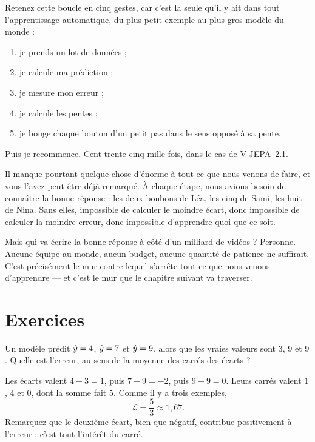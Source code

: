 \begin{aretenir}
Retenez cette boucle en cinq gestes, car c'est la seule qu'il y ait dans
tout l'apprentissage automatique, du plus petit exemple au plus gros modèle
du monde :

\begin{enumerate}
  \item je prends un lot de données ;
  \item je calcule ma prédiction ;
  \item je mesure mon erreur ;
  \item je calcule les pentes ;
  \item je bouge chaque bouton d'un petit pas dans le sens opposé à sa pente.
\end{enumerate}

Puis je recommence. Cent trente-cinq mille fois, dans le cas de V-JEPA~2.1.
\end{aretenir}

Il manque pourtant quelque chose d'énorme à tout ce que nous venons de
faire, et vous l'avez peut-être déjà remarqué. À chaque étape, nous avions
besoin de connaître la bonne réponse : les deux bonbons de Léa, les cinq de
Sami, les huit de Nina. Sans elles, impossible de calculer le moindre écart,
donc impossible de calculer la moindre erreur, donc impossible d'apprendre
quoi que ce soit.

Mais qui va écrire la bonne réponse à côté d'un milliard de vidéos ?
Personne. Aucune équipe au monde, aucun budget, aucune quantité de patience
ne suffirait. C'est précisément le mur contre lequel s'arrête tout ce que
nous venons d'apprendre — et c'est le mur que le chapitre suivant va
traverser.

\section*{Exercices}

\begin{exercice}
Un modèle prédit $\hat{y} = 4$, $\hat{y} = 7$ et $\hat{y} = 9$, alors que
les vraies valeurs sont $3$, $9$ et $9$. Quelle est l'erreur, au sens de la
moyenne des carrés des écarts ?
\end{exercice}

\begin{solution}
Les écarts valent $4 - 3 = 1$, puis $7 - 9 = -2$, puis $9 - 9 = 0$. Leurs
carrés valent $1$, $4$ et $0$, dont la somme fait $5$. Comme il y a trois
exemples,
\[
  \mathcal{L} = \frac{5}{3} \approx 1{,}67 .
\]
Remarquez que le deuxième écart, bien que négatif, contribue positivement à
l'erreur : c'est tout l'intérêt du carré.
\end{solution}

